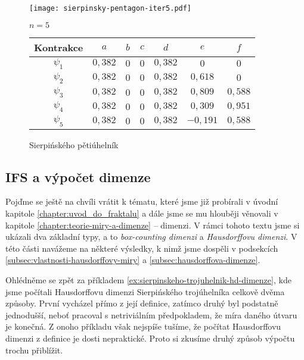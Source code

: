 \begin{figure}[H]
    \centering
    \texttt{[image: sierpinsky-pentagon-iter5.pdf]}
    \begin{center}
        $n=5$
    \end{center}
    \begin{tabular}{c|cccccc}
    Kontrakce   & $a$   & $b$   & $c$   & $d$   & $e$   & $f$                   \\\hline
    $\psi_1$    & $0{,}382$ & $0$ & $0$ & $0{,}382$ & $0$   & $0$               \\
    $\psi_2$    & $0{,}382$ & $0$ & $0$ & $0{,}382$ & $0{,}618$   & $0$         \\
    $\psi_3$    & $0{,}382$ & $0$ & $0$ & $0{,}382$ & $0{,}809$   & $0{,}588$   \\
    $\psi_4$    & $0{,}382$ & $0$ & $0$ & $0{,}382$ & $0{,}309$   & $0{,}951$   \\
    $\psi_5$    & $0{,}382$ & $0$ & $0$ & $0{,}382$ & $-0{,}191$   & $0{,}588$  \\
    \end{tabular}
    \caption{Sierpińského pětiúhelník}
    \label{fig:sierpinskeho-petiuhelnik}
\end{figure}

\subsection{IFS a výpočet dimenze}\label{subsec:ifs-vypocet-dimenze}

Pojďme se ještě na chvíli vrátit k tématu, které jsme již probírali v úvodní kapitole \ref{chapter:uvod_do_fraktalu} a dále jsme se mu hlouběji věnovali v kapitole \ref{chapter:teorie-miry-a-dimenze} -- dimenzi. V rámci tohoto textu jsme si ukázali dva základní typy, a to \emph{box-counting dimenzi} a \emph{Hausdorffovu dimenzi}. V této části navážeme na některé výsledky, k nimž jsme dospěli v podsekcích \ref{subsec:vlastnosti-hausdorffovy-miry} a \ref{subsec:hausdorffova-dimenze}.

Ohlédněme se zpět za příkladem \ref{ex:sierpinskeho-trojuhelnik-hd-dimenze}, kde jsme počítali Hausdorffovu dimenzi Sierpińského trojúhelníka celkově dvěma způsoby. První vycházel přímo z její definice, zatímco druhý byl podstatně jednodušší, neboť pracoval s netriviálním předpokladem, že míra daného útvaru je konečná. Z onoho příkladu však nejspíše tušíme, že počítat Hausdorffovu dimenzi z definice je dosti nepraktické. Proto si zkusíme druhý způsob výpočtu trochu přiblížit.

